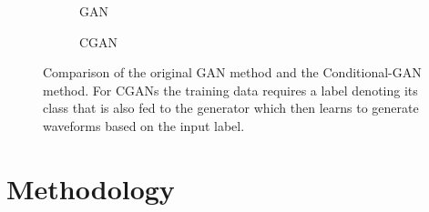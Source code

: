 \documentclass[12pt]{iopart}
\newcommand{\chris}[1]{\textbf{\textcolor{green}{CHRIS: #1}}}
\begin{document}
\begin{figure}[h!]
    \begin{subfigure}{.5\textwidth}
     \centering
        
        \caption{GAN}
    \end{subfigure}
    \begin{subfigure}{.5\textwidth}
     \centering
        
        \caption{CGAN}
    \end{subfigure}
    \caption{Comparison of the original GAN method and the
Conditional-GAN method. For CGANs the training data requires a label denoting
its class that is also fed to the generator which then learns to generate
waveforms based on the input label.}

\label{fig:gan_comparison}
\end{figure}

\section{Methodology}

\end{document}
